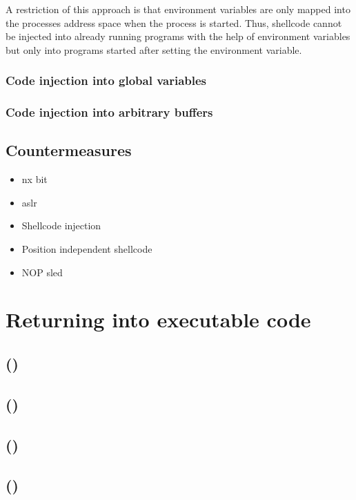 A restriction of this approach is that environment variables are only mapped into the processes address space when the process is started.
Thus, shellcode cannot be injected into already running programs with the help of environment variables but only into programs started after setting the environment variable.

\subsubsection{Code injection into global variables}
\label{subsubsec:ci-via-globals}

\subsubsection{Code injection into arbitrary buffers}
\label{subsubsec:ci-into-arbitrary-buffer}

\subsection{Countermeasures}
\label{subsec:ci-countermeasures}

\begin{itemize}
	\item{\gls{nx} bit}
	\item{\gls{aslr}}
\end{itemize}



\begin{itemize}
	\item{Shellcode injection}
	\item{Position independent shellcode}
	\item{NOP sled}
\end{itemize}

\section{Returning into executable code}
\label{sec:returning-into-executable-code}

\subsection{ ()}
\label{subsec:ret2libc}

\subsection{ ()}
\label{subsec:rop}

\subsection{ ()}
\label{subsec:jop}

\subsection{ ()}
\label{subsec:cop}
